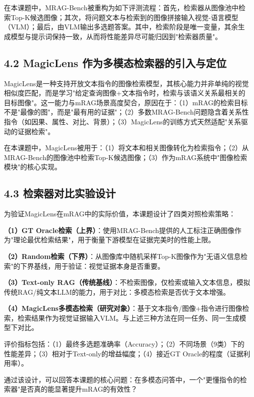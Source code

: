 \documentclass[12pt,a4paper]{article}
\begin{document}
在本课题中，MRAG-Bench被重构为如下评测流程：首先，检索器从图像池中检索Top-K候选图像；其次，将问题文本与检索到的图像拼接输入视觉-语言模型（VLM）；最后，由VLM输出多选题答案。其中，检索阶段是唯一变量，其余生成模型与提示词保持一致，从而将性能差异尽可能归因到"检索器质量"。

\subsection*{4.2 MagicLens 作为多模态检索器的引入与定位}

MagicLens是一种支持开放文本指令的图像检索模型\cite{zhang2024magiclens}，其核心能力并非单纯的视觉相似度匹配，而是学习"给定查询图像+文本指令时，检索与该语义关系最相关的目标图像"。这一能力与mRAG场景高度契合，原因在于：（1）mRAG的检索目标不是"最像的图"，而是"最有用的证据"；（2）多数MRAG-Bench问题隐含着关系性指令（如因果、属性、对比、背景）；（3）MagicLens的训练方式天然适配"关系驱动的证据检索"。

在本课题中，MagicLens被用于：（1）将文本和相关图像转化为检索指令；（2）从MRAG-Bench的图像池中检索Top-K候选图像；（3）作为mRAG系统中"图像检索模块"的核心实现。

\subsection*{4.3 检索器对比实验设计}

为验证MagicLens在mRAG中的实际价值，本课题设计了四类对照检索策略：

\textbf{（1）GT Oracle检索（上界）}：使用MRAG-Bench提供的人工标注正确图像作为"理论最优检索结果"，用于衡量下游模型在证据完美时的性能上限。

\textbf{（2）Random检索（下界）}：从图像库中随机采样Top-K图像作为"无语义信息检索"的下界基线，用于验证：视觉证据本身是否重要。

\textbf{（3）Text-only RAG（传统基线）}：不检索图像，仅检索或输入文本信息，模拟传统RAG/纯文本LLM的能力，用于对比：多模态检索是否优于文本增强\cite{lewis2020rag,gao2023rag}。

\textbf{（4）MagicLens多模态检索（研究对象）}：基于文本指令/图像+指令进行图像检索，检索结果作为视觉证据输入VLM。与上述三种方法在同一任务、同一生成模型下对比\cite{zhang2024magiclens}。

评价指标包括：（1）最终多选题准确率（Accuracy）；（2）不同场景（9类）下的性能差异；（3）相对于Text-only的增益幅度；（4）接近GT Oracle的程度（证据利用率）。

通过该设计，可以回答本课题的核心问题：在多模态问答中，一个"更懂指令的检索器"是否真的能显著提升mRAG的有效性？
\end{document}

